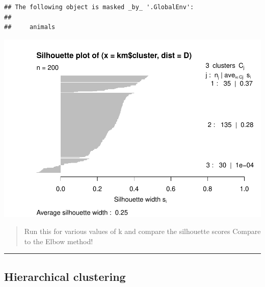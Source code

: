\documentclass[
]{book}
\newenvironment{Shaded}{\begin{snugshade}}{\end{snugshade}}
\newcommand{\AttributeTok}[1]{\textcolor[rgb]{0.13,0.29,0.53}{#1}}
\newcommand{\CommentTok}[1]{\textcolor[rgb]{0.56,0.35,0.01}{\textit{#1}}}
\newcommand{\DecValTok}[1]{\textcolor[rgb]{0.00,0.00,0.81}{#1}}
\newcommand{\FunctionTok}[1]{\textcolor[rgb]{0.13,0.29,0.53}{\textbf{#1}}}
\newcommand{\NormalTok}[1]{#1}
\newcommand{\OtherTok}[1]{\textcolor[rgb]{0.56,0.35,0.01}{#1}}
\newcommand{\SpecialCharTok}[1]{\textcolor[rgb]{0.81,0.36,0.00}{\textbf{#1}}}
\begin{document}
\begin{verbatim}
## The following object is masked _by_ '.GlobalEnv':
## 
##     animals
\end{verbatim}

\begin{Shaded}
\end{Shaded}

\includegraphics{_main_files/figure-latex/unnamed-chunk-74-1.pdf}

\begin{quote}
Run this for various values of k and compare the silhouette scores
Compare to the Elbow method!
\end{quote}

\begin{center}\rule{0.5\linewidth}{0.5pt}\end{center}

\hypertarget{hierarchical-clustering}{%
\subsection{Hierarchical clustering}\label{hierarchical-clustering}}
\end{document}
